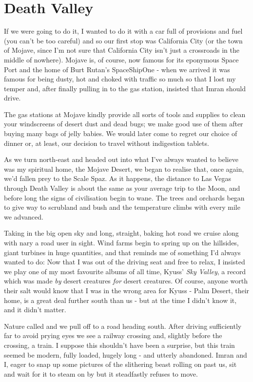\documentclass[a5paper,titlepage,11pt]{book}
\begin{document}

\section*{Death Valley}
If we were going to do it, I wanted to do it with a car full of provisions and fuel (you can't be too careful) and so our first stop was California City (or the town of Mojave, since I'm not sure that California City isn't just a crossroads in the middle of nowhere).  Mojave is, of course, now famous for its eponymous Space Port and the home of Burt Rutan's SpaceShipOne - when we arrived it was famous for being dusty, hot and choked with traffic so much so that I lost my temper and, after finally pulling in to the gas station, insisted that Imran should drive.

The gas stations at Mojave kindly provide all sorts of tools and supplies to clean your windscreens of desert dust and dead bugs; we make good use of them after buying many bags of jelly babies.  We would later come to regret our choice of dinner or, at least, our decision to travel without indigestion tablets.

As we turn north-east and headed out into what I've always wanted to believe was my spiritual home, the Mojave Desert, we began to realise that, once again, we'd fallen prey to the Scale Spaz.  As it happens, the distance to Las Vegas through Death Valley is about the same as your average trip to the Moon, and before long the signs of civilisation begin to wane.  The trees and orchards began to give way to scrubland and bush and the temperature climbs with every mile we advanced.

Taking in the big open sky and long, straight, baking hot road we cruise along with nary a road user in sight.  Wind farms begin to spring up on the hillsides, giant turbines in huge quantities, and that reminds me of something I'd always wanted to do:  Now that I was out of the driving seat and free to relax, I insisted we play one of my most favourite albums of all time, Kyuss' \emph{Sky Valley}, a record which was made \emph{by} desert creatures \emph{for} desert creatures.  Of course, anyone worth their salt would know that I was in the wrong area for Kyuss - Palm Desert, their home, is a great deal further south than us - but at the time I didn't know it, and it didn't matter.

Nature called and we pull off to a road heading south.  After driving sufficiently far to avoid prying eyes we see a railway crossing and, slightly before the crossing, a train. I suppose this shouldn't have been a surprise, but this train seemed be modern, fully loaded, hugely long - and utterly abandoned.  Imran and I, eager to snap up some pictures of the slithering beast rolling on past us, sit and wait for it to steam on by but it steadfastly refuses to move.
\end{document}
